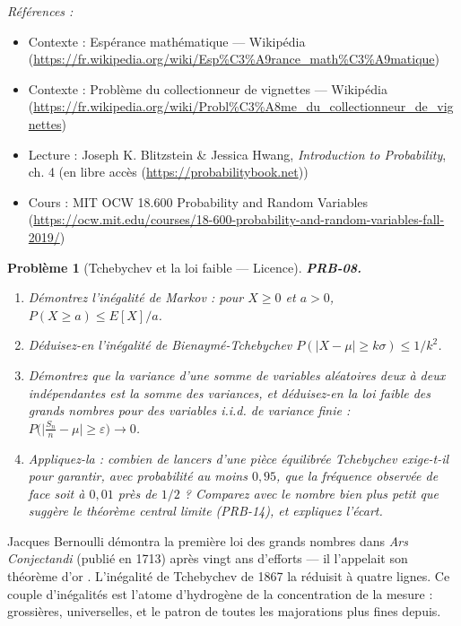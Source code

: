 \documentclass[11pt]{article}
\newtheorem{problem}{Problème}
\newenvironment{refs}{\par\small\noindent\emph{Références :}\begin{itemize}\setlength\itemsep{0pt}}{\end{itemize}\normalsize}
\begin{document}
\begin{refs}
\item Contexte : Espérance mathématique --- Wikipédia (\url{https://fr.wikipedia.org/wiki/Esp%C3%A9rance_math%C3%A9matique})
\item Contexte : Problème du collectionneur de vignettes --- Wikipédia (\url{https://fr.wikipedia.org/wiki/Probl%C3%A8me_du_collectionneur_de_vignettes})
\item Lecture : Joseph K. Blitzstein \& Jessica Hwang, \textit{Introduction to Probability}, ch. 4 (en libre accès (\url{https://probabilitybook.net}))
\item Cours : MIT OCW 18.600 Probability and Random Variables (\url{https://ocw.mit.edu/courses/18-600-probability-and-random-variables-fall-2019/})
\end{refs}

\bigskip

\begin{problem}[{Tchebychev et la loi faible --- Licence}]
\textbf{PRB-08.} \begin{enumerate}
\item[(i)] Démontrez l'inégalité de Markov : pour $ X\ge 0 $
et $ a>0 $, $ P(X\ge a) \le E[X]/a $.
\item[(ii)] Déduisez-en l'inégalité de Bienaymé-Tchebychev
$ P(|X-\mu| \ge k\sigma) \le 1/k^2 $.
\item[(iii)] Démontrez que la variance d'une somme de variables aléatoires deux à deux indépendantes est la
somme des variances, et déduisez-en la loi faible des grands nombres pour des variables i.i.d. de
variance finie : $ P\big( \big| \frac{S_n}{n} - \mu \big| \ge \varepsilon \big) \to 0 $.
\item[(iv)] Appliquez-la : combien de lancers d'une pièce équilibrée Tchebychev exige-t-il pour garantir,
avec probabilité au moins $ 0{,}95 $, que la fréquence observée de \og{} face \fg{} soit à $ 0{,}01 $
près de $ 1/2 $ ? Comparez avec le nombre bien plus petit que suggère le théorème central limite
(PRB-14), et expliquez l'écart.
\end{enumerate}

\end{problem}

\noindent Jacques Bernoulli démontra la première loi des grands nombres dans
\textit{Ars Conjectandi} (publié en 1713) après vingt ans d'efforts --- il l'appelait son \og{} théorème
d'or \fg{}. L'inégalité de Tchebychev de 1867 la réduisit à quatre lignes. Ce couple d'inégalités est
l'atome d'hydrogène de la concentration de la mesure : grossières, universelles, et le patron de
toutes les majorations plus fines depuis.
\end{document}
